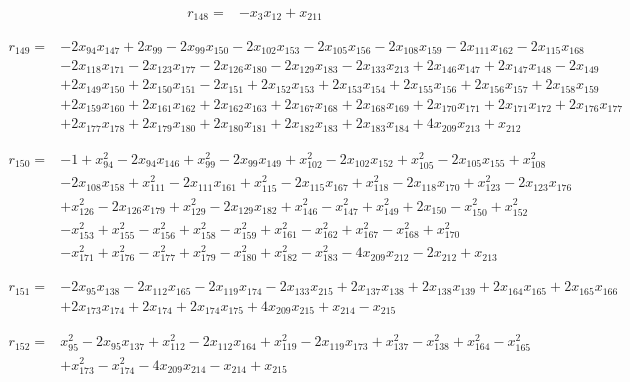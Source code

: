 \begin{align*}
r_{148}={}&-x_{3}x_{12}+x_{211}
\end{align*}

\begin{align*}
r_{149}={}&-2x_{94}x_{147}+2x_{99}-2x_{99}x_{150}-2x_{102}x_{153}-2x_{105}x_{156}-2x_{108}x_{159}-2x_{111}x_{162}-2x_{115}x_{168}\\
&-2x_{118}x_{171}-2x_{123}x_{177}-2x_{126}x_{180}-2x_{129}x_{183}-2x_{133}x_{213}+2x_{146}x_{147}+2x_{147}x_{148}-2x_{149}\\
&+2x_{149}x_{150}+2x_{150}x_{151}-2x_{151}+2x_{152}x_{153}+2x_{153}x_{154}+2x_{155}x_{156}+2x_{156}x_{157}+2x_{158}x_{159}\\
&+2x_{159}x_{160}+2x_{161}x_{162}+2x_{162}x_{163}+2x_{167}x_{168}+2x_{168}x_{169}+2x_{170}x_{171}+2x_{171}x_{172}+2x_{176}x_{177}\\
&+2x_{177}x_{178}+2x_{179}x_{180}+2x_{180}x_{181}+2x_{182}x_{183}+2x_{183}x_{184}+4x_{209}x_{213}+x_{212}
\end{align*}

\begin{align*}
r_{150}={}&-1+x_{94}^{2}-2x_{94}x_{146}+x_{99}^{2}-2x_{99}x_{149}+x_{102}^{2}-2x_{102}x_{152}+x_{105}^{2}-2x_{105}x_{155}+x_{108}^{2}\\
&-2x_{108}x_{158}+x_{111}^{2}-2x_{111}x_{161}+x_{115}^{2}-2x_{115}x_{167}+x_{118}^{2}-2x_{118}x_{170}+x_{123}^{2}-2x_{123}x_{176}\\
&+x_{126}^{2}-2x_{126}x_{179}+x_{129}^{2}-2x_{129}x_{182}+x_{146}^{2}-x_{147}^{2}+x_{149}^{2}+2x_{150}-x_{150}^{2}+x_{152}^{2}\\
&-x_{153}^{2}+x_{155}^{2}-x_{156}^{2}+x_{158}^{2}-x_{159}^{2}+x_{161}^{2}-x_{162}^{2}+x_{167}^{2}-x_{168}^{2}+x_{170}^{2}\\
&-x_{171}^{2}+x_{176}^{2}-x_{177}^{2}+x_{179}^{2}-x_{180}^{2}+x_{182}^{2}-x_{183}^{2}-4x_{209}x_{212}-2x_{212}+x_{213}
\end{align*}

\begin{align*}
r_{151}={}&-2x_{95}x_{138}-2x_{112}x_{165}-2x_{119}x_{174}-2x_{133}x_{215}+2x_{137}x_{138}+2x_{138}x_{139}+2x_{164}x_{165}+2x_{165}x_{166}\\
&+2x_{173}x_{174}+2x_{174}+2x_{174}x_{175}+4x_{209}x_{215}+x_{214}-x_{215}
\end{align*}

\begin{align*}
r_{152}={}&x_{95}^{2}-2x_{95}x_{137}+x_{112}^{2}-2x_{112}x_{164}+x_{119}^{2}-2x_{119}x_{173}+x_{137}^{2}-x_{138}^{2}+x_{164}^{2}-x_{165}^{2}\\
&+x_{173}^{2}-x_{174}^{2}-4x_{209}x_{214}-x_{214}+x_{215}
\end{align*}

\endgroup
